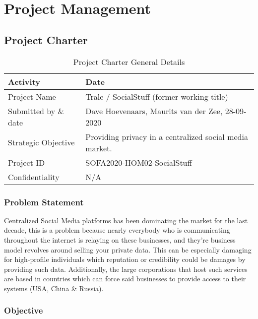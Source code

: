 

\chapter{Project Management}\label{ch:project-management}


\section{Project Charter}\label{sec:project-charter}

\begin{table}[htp]
    \centering
    \caption{Project Charter General Details}
    \begin{tabular}{@{}|l|l|@{}}
        \hline
        \textbf{Activity} & \textbf{Date} \\
        \toprule
        \hline
        Project Name & Trale / SocialStuff (former working title) \\
        Submitted by \& date & Dave Hoevenaars, Maurits van der Zee, 28-09-2020 \\
        Strategic Objective & Providing privacy in a centralized social media market. \\
        Project ID & SOFA2020-HOM02-SocialStuff \\
        Confidentiality & N/A \\
        \hline
    \end{tabular}
    \label{tab:my-table}
\end{table}

\subsection{Problem Statement}\label{subsec:problem-statement}

Centralized Social Media platforms has been dominating the market for the last decade, this is a problem because nearly
everybody who is communicating throughout the internet is relaying on these businesses, and they’re business model
revolves around selling your private data.
This can be especially damaging for high-profile individuals which reputation or credibility could be damages by
providing such data.
Additionally, the large corporations that host such services are based in countries which can force said businesses to
provide access to their systems (USA, China \& Russia).

\subsection{Objective}\label{subsec:objective}

